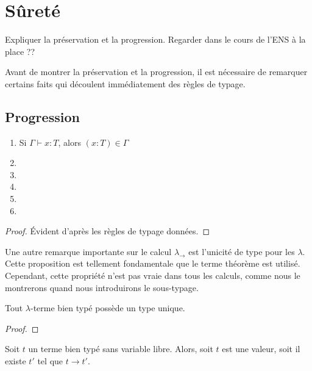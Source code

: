 \section{Sûreté}

Expliquer la préservation et la progression.
Regarder dans le cours de l'ENS à la place ??

Avant de montrer la préservation et la progression, il est nécessaire de
remarquer certains faits qui découlent immédiatement des règles de typage.

\subsection*{Progression}

\begin{lemma} 
  \begin{enumerate}
    \item Si $\Gamma \vdash x : T$, alors $(x : T) \in \Gamma$
    \item 
    \item 
    \item 
    \item 
    \item 
  \end{enumerate}
\end{lemma}
  
\begin{proof}
  Évident d'après les règles de typage données.
\end{proof}

Une autre remarque importante sur le calcul $\lambda_{\rightarrow}$ est
l'unicité de type pour les $\lambda$. Cette proposition est tellement
fondamentale que le terme théorème est utilisé. Cependant, cette propriété n'est
pas vraie dans tous les calculs, comme nous le montrerons quand nous
introduirons le sous-typage.

\begin{theorem}
  Tout $\lambda$-terme bien typé possède un type unique.
\end{theorem}

\begin{proof}
  
\end{proof}

\begin{theorem} 
  Soit $t$ un terme bien typé sans variable libre. Alors, soit $t$ est une
  valeur, soit il existe $t'$ tel que $t \rightarrow t'$.
\end{theorem}

